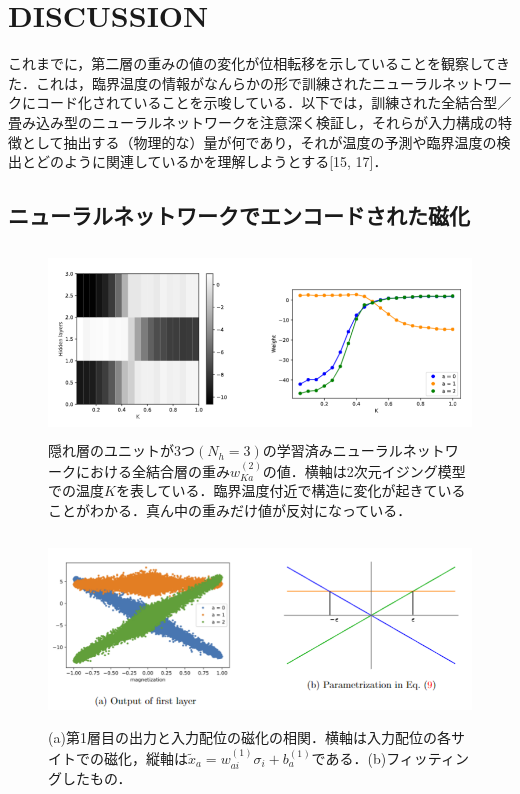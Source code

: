 \documentclass[a4paper,11pt]{jsarticle}
\begin{document}
\section{DISCUSSION}
これまでに，第二層の重みの値の変化が位相転移を示していることを観察してきた．これは，臨界温度の情報がなんらかの形で訓練されたニューラルネットワークにコード化されていることを示唆している．以下では，訓練された全結合型／畳み込み型のニューラルネットワークを注意深く検証し，それらが入力構成の特徴として抽出する（物理的な）量が何であり，それが温度の予測や臨界温度の検出とどのように関連しているかを理解しようとする[15, 17]．

\subsection{ニューラルネットワークでエンコードされた磁化}
\begin{figure}[hb]
  \begin{center}
    \includegraphics[height=5cm]{image/Figure3.png}
    \caption{隠れ層のユニットが3つ$(N_h=3)$の学習済みニューラルネットワークにおける全結合層の重み$w_{Ka}^{(2)}$の値．横軸は2次元イジング模型での温度$K$を表している．臨界温度付近で構造に変化が起きていることがわかる．真ん中の重みだけ値が反対になっている．}
  \end{center}
\end{figure}
\begin{figure}[hb]
  \begin{center}
    \includegraphics[height=5cm]{image/Figure4.png}
    \caption{(a)第1層目の出力と入力配位の磁化の相関．横軸は入力配位の各サイトでの磁化，縦軸は$\tilde{x}_a=w_{ai}^{(1)}\sigma_i+b_a^{(1)}$である．(b)フィッティングしたもの．}
  \end{center}
\end{figure}
\end{document}
